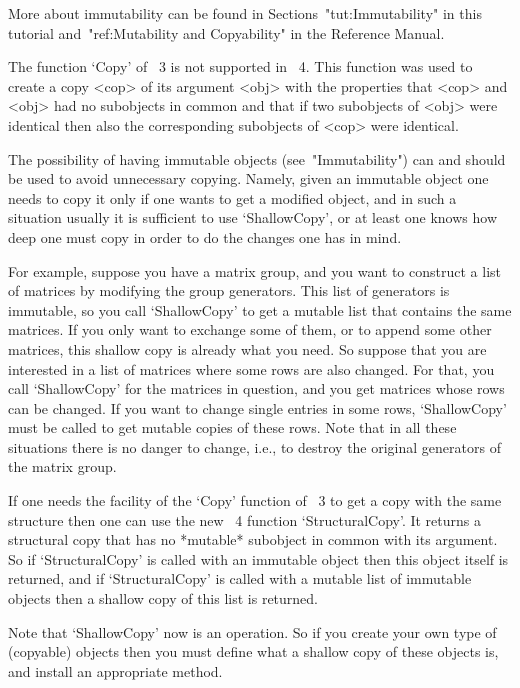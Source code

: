 More about immutability can be found in Sections~"tut:Immutability" in
this tutorial and~"ref:Mutability and Copyability" in the Reference
Manual.



The function `Copy' of {\GAP}~3 is not supported in {\GAP}~4.  This
function was used to create a copy <cop> of its argument <obj> with
the properties that <cop> and <obj> had no subobjects in common and
that if two subobjects of <obj> were identical then also the
corresponding subobjects of <cop> were identical.

The possibility of having immutable objects (see~"Immutability") can and
should be used to avoid unnecessary copying.
Namely, given an immutable object one needs to copy it only if one wants
to get a modified object, and in such a situation usually it is
sufficient to use `ShallowCopy', or at least one knows how deep one must
copy in order to do the changes one has in mind.

For example, suppose you have a matrix group, and you want to
construct a list of matrices by modifying the group generators.  This
list of generators is immutable, so you call `ShallowCopy' to get a
mutable list that contains the same matrices.  If you only want to
exchange some of them, or to append some other matrices, this shallow
copy is already what you need.  So suppose that you are interested in
a list of matrices where some rows are also changed.  For that, you
call `ShallowCopy' for the matrices in question, and you get matrices
whose rows can be changed.  If you want to change single entries in
some rows, `ShallowCopy' must be called to get mutable copies of these
rows.  Note that in all these situations there is no danger to change,
i.e., to destroy the original generators of the matrix group.

If one needs the facility of the `Copy' function of {\GAP}~3 to get a
copy with the same structure then one can use the new {\GAP}~4
function `StructuralCopy'.  It returns a structural copy that has no
*mutable* subobject in common with its argument.  So if
`StructuralCopy' is called with an immutable object then this object
itself is returned, and if `StructuralCopy' is called with a mutable
list of immutable objects then a shallow copy of this list is
returned.

Note that `ShallowCopy' now is an operation.  So if you create your
own type of (copyable) objects then you must define what a shallow
copy of these objects is, and install an appropriate method.


